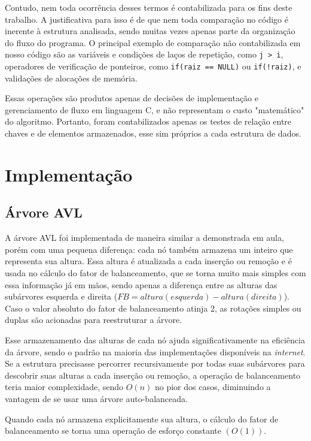 \documentclass[a4paper, 12pt]{article}
\begin{document}
Contudo, nem toda ocorrência desses termos é contabilizada para os fins deste trabalho.
A justificativa para isso é de que nem toda comparação no código é inerente à estrutura
analisada, sendo muitas vezes apenas parte da organização do fluxo do programa.
O principal exemplo de comparação não contabilizada em nosso código são as variáveis e
condições de laços de repetição, como \verb|j > i|, operadores de verificação de ponteiros,
como \verb|if(raiz == NULL)| ou \verb|if(!raiz)|, e validações de alocações de memória.

Essas operações são produtos apenas de decisões de implementação e gerenciamento de
fluxo em linguagem C, e não representam o custo "matemático" do algoritmo. Portanto,
foram contabilizados apenas os testes de relação entre chaves e de elementos armazenados,
esse sim próprios a cada estrutura de dados.

\section{Implementação}

\subsection{Árvore AVL}
A árvore AVL foi implementada de maneira similar a demonstrada em aula, porém com
uma pequena diferença: cada nó também armazena um inteiro que representa sua altura.
Essa altura é atualizada a cada inserção ou remoção e é usada no cálculo do fator de
balanceamento, que se torna muito mais simples com essa informação já em mãos, sendo
apenas a diferença entre as alturas das subárvores esquerda e direita
($FB = altura(esquerda) - altura(direita)$). 
Caso o valor absoluto do fator de balanceamento atinja 2, as rotações simples ou duplas
são acionadas para reestruturar a árvore.

Esse armazenamento das alturas de cada nó ajuda significativamente na eficiência da árvore,
sendo o padrão na maioria das implementações disponíveis na \textit{internet}. Se a estrutura
precisasse percorrer recursivamente por todas suas subárvores para descobrir suas alturas a cada
inserção ou remoção, a operação de balanceamento teria maior complexidade, sendo $O(n)$ no pior
dos casos, diminuindo a vantagem de se usar uma árvore auto-balanceada.

Quando cada nó armazena explicitamente sua altura, o cálculo do fator de balanceamento se torna
uma operação de esforço constante $(O(1))$.
\end{document}
